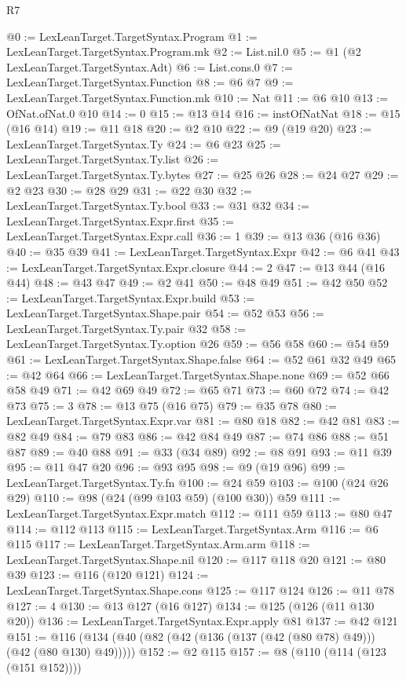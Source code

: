 \begin{lexlean}{R7}
\begin{coremodule}
@0 := LexLeanTarget.TargetSyntax.Program
@1 := LexLeanTarget.TargetSyntax.Program.mk
@2 := List.nil.{0}
@5 := @1 (@2 LexLeanTarget.TargetSyntax.Adt)
@6 := List.cons.{0}
@7 := LexLeanTarget.TargetSyntax.Function
@8 := @6 @7
@9 := LexLeanTarget.TargetSyntax.Function.mk
@10 := Nat
@11 := @6 @10
@13 := OfNat.ofNat.{0} @10
@14 := 0
@15 := @13 @14
@16 := instOfNatNat
@18 := @15 (@16 @14)
@19 := @11 @18
@20 := @2 @10
@22 := @9 (@19 @20)
@23 := LexLeanTarget.TargetSyntax.Ty
@24 := @6 @23
@25 := LexLeanTarget.TargetSyntax.Ty.list
@26 := LexLeanTarget.TargetSyntax.Ty.bytes
@27 := @25 @26
@28 := @24 @27
@29 := @2 @23
@30 := @28 @29
@31 := @22 @30
@32 := LexLeanTarget.TargetSyntax.Ty.bool
@33 := @31 @32
@34 := LexLeanTarget.TargetSyntax.Expr.first
@35 := LexLeanTarget.TargetSyntax.Expr.call
@36 := 1
@39 := @13 @36 (@16 @36)
@40 := @35 @39
@41 := LexLeanTarget.TargetSyntax.Expr
@42 := @6 @41
@43 := LexLeanTarget.TargetSyntax.Expr.closure
@44 := 2
@47 := @13 @44 (@16 @44)
@48 := @43 @47
@49 := @2 @41
@50 := @48 @49
@51 := @42 @50
@52 := LexLeanTarget.TargetSyntax.Expr.build
@53 := LexLeanTarget.TargetSyntax.Shape.pair
@54 := @52 @53
@56 := LexLeanTarget.TargetSyntax.Ty.pair @32
@58 := LexLeanTarget.TargetSyntax.Ty.option @26
@59 := @56 @58
@60 := @54 @59
@61 := LexLeanTarget.TargetSyntax.Shape.false
@64 := @52 @61 @32 @49
@65 := @42 @64
@66 := LexLeanTarget.TargetSyntax.Shape.none
@69 := @52 @66 @58 @49
@71 := @42 @69 @49
@72 := @65 @71
@73 := @60 @72
@74 := @42 @73
@75 := 3
@78 := @13 @75 (@16 @75)
@79 := @35 @78
@80 := LexLeanTarget.TargetSyntax.Expr.var
@81 := @80 @18
@82 := @42 @81
@83 := @82 @49
@84 := @79 @83
@86 := @42 @84 @49
@87 := @74 @86
@88 := @51 @87
@89 := @40 @88
@91 := @33 (@34 @89)
@92 := @8 @91
@93 := @11 @39
@95 := @11 @47 @20
@96 := @93 @95
@98 := @9 (@19 @96)
@99 := LexLeanTarget.TargetSyntax.Ty.fn
@100 := @24 @59
@103 := @100 (@24 @26 @29)
@110 := @98 (@24 (@99 @103 @59) (@100 @30)) @59
@111 := LexLeanTarget.TargetSyntax.Expr.match
@112 := @111 @59
@113 := @80 @47
@114 := @112 @113
@115 := LexLeanTarget.TargetSyntax.Arm
@116 := @6 @115
@117 := LexLeanTarget.TargetSyntax.Arm.arm
@118 := LexLeanTarget.TargetSyntax.Shape.nil
@120 := @117 @118 @20
@121 := @80 @39
@123 := @116 (@120 @121)
@124 := LexLeanTarget.TargetSyntax.Shape.cons
@125 := @117 @124
@126 := @11 @78
@127 := 4
@130 := @13 @127 (@16 @127)
@134 := @125 (@126 (@11 @130 @20))
@136 := LexLeanTarget.TargetSyntax.Expr.apply @81
@137 := @42 @121
@151 := @116 (@134 (@40 (@82 (@42 (@136 (@137 (@42 (@80 @78) @49))) (@42 (@80 @130) @49)))))
@152 := @2 @115
@157 := @8 (@110 (@114 (@123 (@151 @152))))

\end{coremodule}
\end{lexlean}
